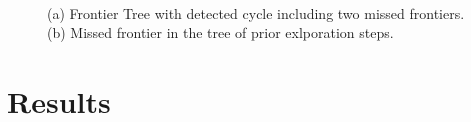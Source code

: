 \documentclass[twocolumn]{svjour3}[2016]
\begin{document}
\begin{figure}
\centering
  \mbox{
  }
  \caption{(a) Frontier Tree with detected cycle including two missed frontiers. (b) Missed frontier in the tree of prior exlporation steps.}
  \label{tree_example}       %
\end{figure}

\section{Results}
\end{document}
